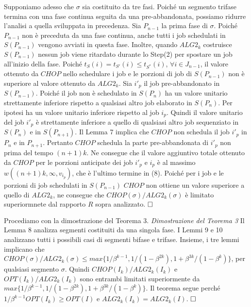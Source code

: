 \documentclass[twoside,openany,titlepage,fleqn,
	headinclude,12pt,a4paper,BCOR5mm,footinclude]{scrbook}
\begin{document}
Supponiamo adesso che $\sigma$ sia costituito da tre fasi. Poiché un segmento trifase termina con una fase continua seguita da una pre-abbandonata, possiamo ridurre l'analisi a quella sviluppata in precedenza. Sia $P_{n - 1}$ la prima fase di $\sigma$. Poiché $P_{n - 1}$ non è preceduta da una fase continua, anche tutti i job schedulati in $S (P_{n - 1})$ vengono avviati in questa fase. Inoltre, quando $ALG2_{k}$ costruisce $S (P_{n - 1})$ nessun job viene ritardato durante lo Step(2) per spostare un job all'inizio della fase. Poiché $t_{S}(i) = t_{S'} (i) \leq t_{S^{*}} (i)$, $\forall i \in J_{n-1}$, il valore ottenuto da $CHOP$ nello schedulare i job e le porzioni di job di $S(P_{n - 1})$ non è superiore al valore ottenuto da $ALG2_{k}$. Sia $i'_{p}$ il job pre-abbandonato in $S (P_{n - 1})$. Poiché il job non è schedulato in $S(P_{n})$ ha un valore unitario strettamente inferiore rispetto a qualsiasi altro job elaborato in $S (P_{n})$. Per ipotesi ha un valore unitario inferiore rispetto al job $i_{p}$. Quindi il valore unitario del job $i'_{p}$ è strettamente inferiore a quello di qualsiasi altro job sequenziato in $S (P_{n})$ e in $S(P_{n + 1})$. Il Lemma 7 implica che $CHOP$ non schedula il job $i'_{p}$ in $P_{n}$ e in $P_{n + 1}$. Pertanto $CHOP$ schedula la parte pre-abbandonata di $i'_{p}$ non prima del tempo $(n + 1) k$. Ne consegue che il valore aggiuntivo totale ottenuto da $CHOP$ per le porzioni anticipate dei job $i'_{p}$ e $i_{p}$ è al massimo $w ((n + 1) k, \infty, v_{i_{p}})$, che è l'ultimo termine in (8). Poiché per i job e le porzioni di job schedulati in $S (P_{n - 1})$ $CHOP$ non ottiene un valore superiore a quello di $ALG2_{k}$, ne consegue che $CHOP (\sigma) / ALG2_{k} (\sigma)$ è limitato superiormnete dal rapporto $R$ sopra analizzato. $\hfill \square$

Procediamo con la dimostrazione del Teorema 3.
\newline \newline
\textit{Dimostrazione del Teorema 3} Il Lemma 8 analizza segmenti costituiti da una singola fase.
I Lemmi 9 e 10 analizzano tutti i possibili casi di segmenti bifase e trifase.
Insieme, i tre lemmi implicano che $CHOP (\sigma) / ALG2_{k} (\sigma) \leq max \{1 / \beta^{k-1}, 1 / (1 -\beta^{2k}), 1 + \beta^{3k} / (1 - \beta^{k} )\}$, per qualsiasi segmento $\sigma$. Quindi $CHOP (I_{k}) / ALG2_{k} (I_{k})$ e $OPT (I_{k}) / ALG2_{k} (I_{k})$ sono entrambi limitati superiormente da $max \{1 / \beta^{k-1}, 1 / (1 - \beta^{2k}), 1 + \beta^{3k} / (1 - \beta^{k})\}$. Il teorema segue perché $1 / \beta^{k-1}OPT(I_{k}) \geq OPT(I)$ e $ALG2_{k} (I_{k}) = ALG2_{k} (I)$. $\hfill \square$
\end{document}
